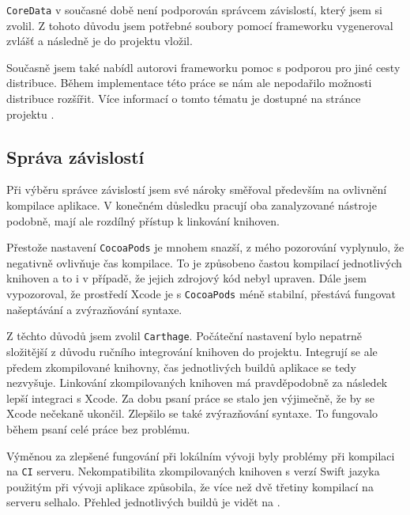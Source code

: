 \texttt{CoreData} v současné době není podporován správcem závislostí, který jsem si zvolil.
Z tohoto důvodu jsem potřebné soubory pomocí frameworku vygeneroval zvlášť a následně je do projektu vložil.

Současně jsem také nabídl autorovi frameworku pomoc s podporou pro jiné cesty distribuce.
Během implementace této práce se nám ale nepodařilo možnosti distribuce rozšířit.
Více informací o tomto tématu je dostupné na stránce projektu \cite{github-iconic-brew}.

\subsection{Správa závislostí}

Při výběru správce závislostí jsem své nároky směřoval především na ovlivnění kompilace aplikace.
V konečném důsledku pracují oba zanalyzované nástroje podobně, mají ale rozdílný přístup k linkování knihoven.

Přestože nastavení \texttt{CocoaPods} je mnohem snazší, z mého pozorování vyplynulo, že negativně ovlivňuje čas kompilace.
To je způsobeno častou kompilací jednotlivých knihoven a to i v případě, že jejich zdrojový kód nebyl upraven.
Dále jsem vypozoroval, že prostředí Xcode je s \texttt{CocoaPods} méně stabilní, přestává fungovat našeptávání a zvýrazňování syntaxe.

Z těchto důvodů jsem zvolil \texttt{Carthage}.
Počáteční nastavení bylo nepatrně složitější z důvodu ručního integrování knihoven do projektu.
Integrují se ale předem zkompilované knihovny, čas jednotlivých buildů aplikace se tedy nezvyšuje.
Linkování zkompilovaných knihoven má pravděpodobně za následek lepší integraci s Xcode.
Za dobu psaní práce se stalo jen výjimečně, že by se Xcode nečekaně ukončil.
Zlepšilo se také zvýrazňování syntaxe.
To fungovalo během psaní celé práce bez problému.

Výměnou za zlepšené fungování při lokálním vývoji byly problémy při kompilaci na \texttt{CI} serveru.
Nekompatibilita zkompilovaných knihoven s verzí Swift jazyka použitým při vývoji aplikace způsobila, že více než dvě třetiny kompilací na serveru selhalo.
Přehled jednotlivých buildů je vidět na \cite{travis-octophone-builds}.
